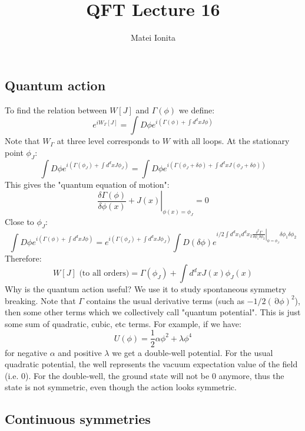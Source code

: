 \documentclass[12 pt]{article}
\title{QFT Lecture 16}
\author{Matei Ionita}
\DeclareMathOperator {\p} {\partial}
\begin{document}
  \maketitle

\subsection*{Quantum action}

To find the relation between $W[J]$ and $\Gamma(\phi)$ we define:
\[      e^{iW_{\Gamma}[J]}   = \int D\phi e^{i(\Gamma(\phi) + \int d^d x J\phi)}    \]
Note that $W_{\Gamma}$ at three level corresponds to $W$ with all loops. At the stationary point $\phi_J$:
\[        \int D\phi e^{i(\Gamma(\phi_J) + \int d^d x J\phi_J)}  =     \int D\phi e^{i(\Gamma(\phi_J + \delta \phi) + \int d^d x J( \phi_J + \delta \phi))}      \]
This gives the "quantum equation of motion":
\[   \left.    \frac{\delta \Gamma(\phi)}{\delta \phi(x)}  + J(x)\right|_{\phi(x) = \phi_J} = 0    \]
Close to $\phi_J$:
\[      \int D\phi e^{i(\Gamma(\phi) + \int d^d x J\phi)}  =   e^{i(\Gamma(\phi_J) + \int d^d x J\phi_J)}  \int D(\delta \phi) e^{i/2 \int d^d x_1 d^d x_2 \left. \frac{\delta^2 \Gamma}{\delta \phi_1 \delta \phi_2} \right|_{\phi = \phi_J} \delta \phi_1 \delta \phi_2}  \]
Therefore:
\[    W[J] \text{  (to all orders)}= \Gamma(\phi_J) + \int d^d x J(x) \phi_J(x)         \]
Why is the quantum action useful? We use it to study spontaneous symmetry breaking. Note that $\Gamma$ contains the usual derivative terms (such as $-1/2 (\p \phi)^2$), then some other terms which we collectively call "quantum potential". This is just some sum of quadratic, cubic, etc terms. For example, if we have:
\[     U(\phi) = \frac{1}{2} \alpha \phi^2 + \lambda \phi^4       \]
for negative $\alpha$ and positive $\lambda$ we get a double-well potential. For the usual quadratic potential, the well represents the vacuum expectation value of the field (i.e. 0). For the double-well, the ground state will not be 0 anymore, thus the state is not symmetric, even though the action looks symmetric.


\subsection*{Continuous symmetries}
\end{document}
